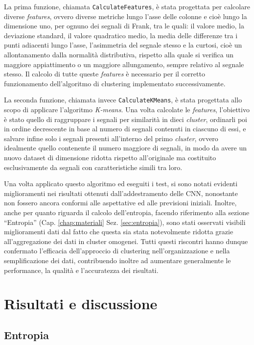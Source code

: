 \documentclass[12pt,italian]{report}
\begin{document}
La prima funzione, chiamata \texttt{CalculateFeatures}, è stata progettata per calcolare diverse \textit{features}, ovvero diverse metriche lungo l'asse delle colonne e cioè lungo la dimensione uno, per ognuno dei segnali di Frank, tra le quali: il valore medio, la deviazione standard, il valore quadratico medio, la media delle differenze tra i punti adiacenti lungo l'asse, l'asimmetria del segnale stesso e la curtosi, cioè un allontanamento dalla normalità distributiva, rispetto alla quale si verifica un maggiore appiattimento o un maggiore allungamento, sempre relativo al segnale stesso. Il calcolo di tutte queste \textit{features} è necessario per il corretto funzionamento dell'algoritmo di clustering implementato successivamente.

La seconda funzione, chiamata invece \texttt{CalculateKMeans}, è stata progettata allo scopo di applicare l'algoritmo \textit{K-means}. Una volta calcolate le \textit{features}, l'obiettivo è stato quello di raggruppare i segnali per similarità in dieci \textit{cluster}, ordinarli poi in ordine decrescente in base al numero di segnali contenuti in ciascuno di essi, e salvare infine solo i segnali presenti all'interno del primo \textit{cluster}, ovvero idealmente quello contenente il numero maggiore di segnali, in modo da avere un nuovo dataset di dimensione ridotta rispetto all'originale ma costituito esclusivamente da segnali con caratteristiche simili tra loro.

Una volta applicato questo algoritmo ed eseguiti i test, si sono notati evidenti miglioramenti nei risultati ottenuti dall'addestramento delle CNN, nonostante non fossero ancora conformi alle aspettative ed alle previsioni iniziali. Inoltre, anche per quanto riguarda il calcolo dell'entropia, facendo riferimento alla sezione ``Entropia'' (Cap. \ref{chap:materiali} Sez. \ref{sec:entropia}), sono stati osservati visibili miglioramenti dati dal fatto che questa sia stata notevolmente ridotta grazie all'aggregazione dei dati in cluster omogenei. Tutti questi riscontri hanno dunque confermato l'efficacia dell'approccio di clustering nell'organizzazione e nella semplificazione dei dati, contribuendo inoltre ad aumentare generalmente le performance, la qualità e l'accuratezza dei risultati.

\chapter{Risultati e discussione}
\label{chap:risultati}

\section{Entropia}
\label{sec:entropia_risultati}
\end{document}
